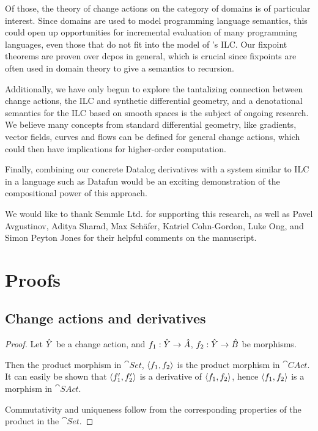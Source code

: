 Of those, the theory of change actions on the category of domains is of particular interest. Since
domains are used to model programming language semantics, this could
open up opportunities for incremental evaluation of many programming languages,
even those that do not fit into the model of \citeauthor{cai2014changes}'s ILC.
Our fixpoint theorems are proven over dcpos in general, which is crucial since
fixpoints are often used in domain theory to give a semantics to recursion.

Additionally, we have only begun to explore the tantalizing connection between
change actions, the ILC and synthetic
differential geometry, and a denotational semantics for the
ILC based on smooth spaces is the subject of ongoing research. We believe many concepts
from standard differential geometry, like gradients, vector fields, curves and flows can
be defined for general change actions, which could then have implications for higher-order
computation.

Finally, combining our concrete Datalog derivatives with a system similar to ILC
in a language such as Datafun would be an exciting demonstration of the compositional
power of this approach.

\begin{acks}

We would like to thank Semmle Ltd. for supporting this research, as well as Pavel
Avgustinov, Aditya Sharad, Max Sch\"afer, Katriel Cohn-Gordon, Luke Ong, and Simon Peyton Jones for their
helpful comments on the manuscript.

\end{acks}

\printbibliography

\clearpage
\appendix
\appendixpage
\section{Proofs}

\subsection{Change actions and derivatives}

\products*
\begin{proof}
  \label{prf:products}
  Let $\hat{Y}$ be a change action, and $f_1: \hat{Y} \rightarrow \hat{A}$, $f_2: \hat{Y}
  \rightarrow \hat{B}$ be morphisms.

  Then the product morphism in $\cat{Set}$, $\left\langle {f_1}, {f_2} \right\rangle$ is the product
  morphism in $\cat{CAct}$. It can easily be
  shown that $\left\langle {f_1'}, {f_2'} \right\rangle$ is a derivative of $\left\langle {f_1}, {f_2} \right\rangle$,
  hence $\left\langle {f_1}, {f_2} \right\rangle$ is a morphism in $\cat{SAct}$.

  Commutativity and uniqueness follow from the corresponding properties of the
  product in the $\cat{Set}$.
\end{proof}

